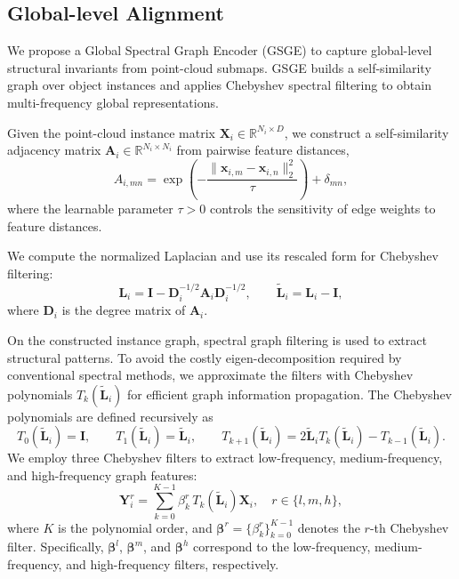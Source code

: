 \documentclass{article}
\begin{document}
\subsection{Global-level Alignment}
We propose a Global Spectral Graph Encoder (GSGE) to capture global-level structural invariants from point-cloud submaps. GSGE builds a self-similarity graph over object instances and applies Chebyshev spectral filtering to obtain multi-frequency global representations.

Given the point-cloud instance matrix $\mathbf{X}_i\in\mathbb{R}^{N_i \times D}$, we construct a self-similarity adjacency matrix $\mathbf{A}_i\in\mathbb{R}^{N_i	\times N_i}$ from pairwise feature distances,
\begin{equation}
A_{i,mn}=\exp\!\left(-\frac{\|\mathbf{x}_{i,m}-\mathbf{x}_{i,n}\|_2^2}{\tau}\right)+\delta_{mn},
\end{equation}
where the learnable parameter $\tau>0$ controls the sensitivity of edge weights to feature distances. 

We compute the normalized Laplacian and use its rescaled form for Chebyshev filtering:
\begin{equation}
\mathbf{L}_i=\mathbf{I}-\mathbf{D}_i^{-1/2}\mathbf{A}_i\mathbf{D}_i^{-1/2},
\qquad
\widetilde{\mathbf{L}}_i=\mathbf{L}_i-\mathbf{I},
\end{equation}
where $\mathbf{D}_i$ is the degree matrix of $\mathbf{A}_i$.

On the constructed instance graph, spectral graph filtering is used to extract structural patterns. To avoid the costly eigen-decomposition required by conventional spectral methods, we approximate the filters with Chebyshev polynomials $T_k(\widetilde{\mathbf{L}}_i)$ for efficient graph information propagation.
The Chebyshev polynomials are defined recursively as
\begin{equation}
T_0(\widetilde{\mathbf{L}}_i)=\mathbf{I}, \qquad T_1(\widetilde{\mathbf{L}}_i)=\widetilde{\mathbf{L}}_i, \qquad T_{k+1}(\widetilde{\mathbf{L}}_i)=2\widetilde{\mathbf{L}}_iT_k(\widetilde{\mathbf{L}}_i)-T_{k-1}(\widetilde{\mathbf{L}}_i).
\end{equation}
We employ three Chebyshev filters to extract low-frequency, medium-frequency, and high-frequency graph features:
\begin{equation}
\mathbf{Y}_i^{r}=\sum_{k=0}^{K-1}\beta_k^{r}\,T_k(\widetilde{\mathbf{L}}_i)\mathbf{X}_i,
\quad r\in\{l,m,h\},
\end{equation}
where $K$ is the polynomial order, and 
$\boldsymbol{\beta}^{r}=\{\beta_k^{r}\}_{k=0}^{K-1}$ denotes the $r$-th Chebyshev filter. Specifically, 
$\boldsymbol{\beta}^{l}$, $\boldsymbol{\beta}^{m}$, and $\boldsymbol{\beta}^{h}$ correspond to the low-frequency, medium-frequency, and high-frequency filters, respectively.
\end{document}
